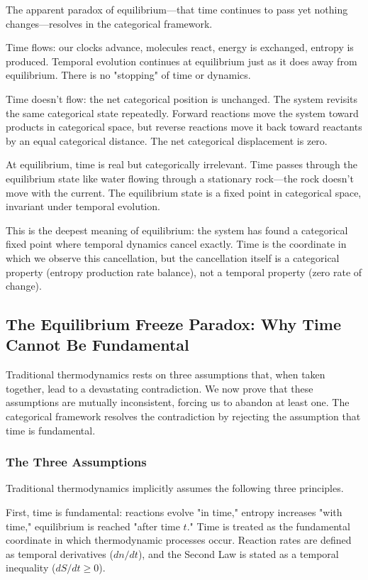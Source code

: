\documentclass[12pt,a4paper]{article}
\theoremstyle{definition}
\theoremstyle{remark}
\begin{document}
The apparent paradox of equilibrium—that time continues to pass yet nothing changes—resolves in the categorical framework.

Time flows: our clocks advance, molecules react, energy is exchanged, entropy is produced. Temporal evolution continues at equilibrium just as it does away from equilibrium. There is no "stopping" of time or dynamics.

Time doesn't flow: the net categorical position is unchanged. The system revisits the same categorical state repeatedly. Forward reactions move the system toward products in categorical space, but reverse reactions move it back toward reactants by an equal categorical distance. The net categorical displacement is zero.

At equilibrium, time is real but categorically irrelevant. Time passes through the equilibrium state like water flowing through a stationary rock—the rock doesn't move with the current. The equilibrium state is a fixed point in categorical space, invariant under temporal evolution.

This is the deepest meaning of equilibrium: the system has found a categorical fixed point where temporal dynamics cancel exactly. Time is the coordinate in which we observe this cancellation, but the cancellation itself is a categorical property (entropy production rate balance), not a temporal property (zero rate of change).

\subsection{The Equilibrium Freeze Paradox: Why Time Cannot Be Fundamental}

Traditional thermodynamics rests on three assumptions that, when taken together, lead to a devastating contradiction. We now prove that these assumptions are mutually inconsistent, forcing us to abandon at least one. The categorical framework resolves the contradiction by rejecting the assumption that time is fundamental.

\subsubsection{The Three Assumptions}

Traditional thermodynamics implicitly assumes the following three principles.

First, time is fundamental: reactions evolve "in time," entropy increases "with time," equilibrium is reached "after time $t$." Time is treated as the fundamental coordinate in which thermodynamic processes occur. Reaction rates are defined as temporal derivatives ($dn/dt$), and the Second Law is stated as a temporal inequality ($dS/dt \geq 0$).
\end{document}
